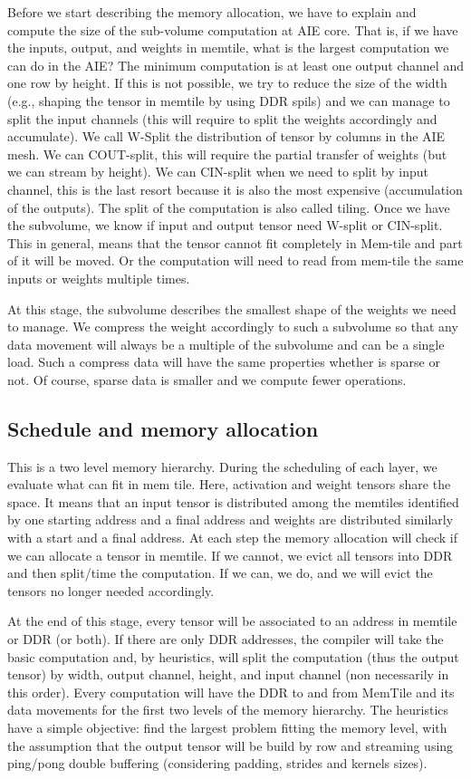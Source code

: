 \documentclass[conference]{IEEEtran}
\begin{document}
Before we start describing the memory allocation, we have to explain
and compute the size of the sub-volume computation at AIE core.  That
is, if we have the inputs, output, and weights in memtile, what is the
largest computation we can do in the AIE? The minimum computation is
at least one output channel and one row by height. If this is not
possible, we try to reduce the size of the width (e.g., shaping the
tensor in memtile by using DDR spils) and we can manage to split the
input channels (this will require to split the weights accordingly and
accumulate). We call W-Split the distribution of tensor by columns in
the AIE mesh. We can COUT-split, this will require the partial
transfer of weights (but we can stream by height).  We can CIN-split
when we need to split by input channel, this is the last resort
because it is also the most expensive (accumulation of the outputs).
The split of the computation is also called tiling. Once we have the
subvolume, we know if input and output tensor need W-split or
CIN-split. This in general, means that the tensor cannot fit
completely in Mem-tile and part of it will be moved. Or the
computation will need to read from mem-tile the same inputs or weights
multiple times.

At this stage, the subvolume describes the smallest shape of the
weights we need to manage. We compress the weight accordingly to such
a subvolume so that any data movement will always be a multiple of the
subvolume and can be a single load. Such a compress data will have the
same properties whether is sparse or not. Of course, sparse data is
smaller and we compute fewer operations.


\subsection{Schedule and memory allocation}
This is a two level memory hierarchy. During the scheduling of each
layer, we evaluate what can fit in mem tile. Here, activation and
weight tensors share the space. It means that an input tensor is
distributed among the memtiles identified by one starting address and
a final address and weights are distributed similarly with a start and a final
address. At each step the memory allocation will check if we can
allocate a tensor in memtile. If we cannot, we evict all tensors into
DDR and then split/time the computation. If we can, we do, and we will
evict the tensors no longer needed accordingly.

At the end of this stage, every tensor will be associated to an
address in memtile or DDR (or both). If there are only DDR addresses,
the compiler will take the basic computation and, by heuristics, will
split the computation (thus the output tensor) by width, output
channel, height, and input channel (non necessarily in this
order). Every computation will have the DDR to and from MemTile and
its data movements for the first two levels of the memory
hierarchy. The heuristics have a simple objective: find the largest
problem fitting the memory level, with the assumption that the output
tensor will be build by row and streaming using ping/pong double
buffering (considering padding, strides and kernels sizes).
\end{document}
